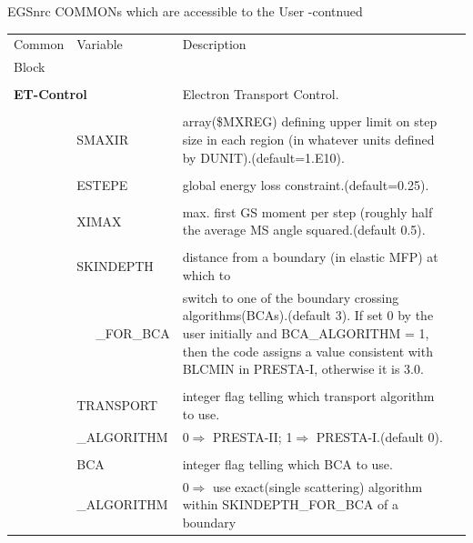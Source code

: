   \begin{table}[htb]
     
     
     
    \begin{center}
    EGSnrc COMMONs which are accessible to the User -contnued\vspace*{3mm}
    \begin{tabular}{ l  l   p{105mm}l  |}
    \hline
    Common & Variable & Description \\
    Block &&\\
    \hline
    &&\\
    \multicolumn{2}{l}{{\bfseries ET-Control}}  &  Electron Transport Control.\\
    &&\\
	&SMAXIR	&array(\$MXREG) defining upper limit on step size in each
		region (in whatever units defined by DUNIT).(default=1.E10).\\
    &&\\
	&ESTEPE	&global energy loss constraint.(default=0.25).\\
    &&\\
	&XIMAX	&max. first GS moment per step (roughly half the average
                MS angle squared.(default 0.5).\\
    &&\\
	&SKINDEPTH      & distance from a boundary (in elastic MFP) at which to\\
	&  ~~~\_FOR\_BCA& switch to one of the boundary crossing
		  algorithms(BCAs).(default 3).  If set 0 by the user
                  initially and BCA\_ALGORITHM = 1, then the code assigns
                  a value consistent with
                  BLCMIN in PRESTA-I, otherwise it is 3.0.\\
    &&\\
	&TRANSPORT& integer flag telling which transport algorithm to use.\\
 	& \_ALGORITHM	& 0$\Rightarrow$ PRESTA-II; 1$\Rightarrow$
                    PRESTA-I.(default 0).\\
    &&\\
	&BCA	&integer flag telling which BCA to use. \\
	&\_ALGORITHM  & 0$\Rightarrow$ use exact(single scattering) algorithm
                         within SKINDEPTH\_FOR\_BCA of a boundary\\


\end{tabular}
\end{center}
\end{table}
